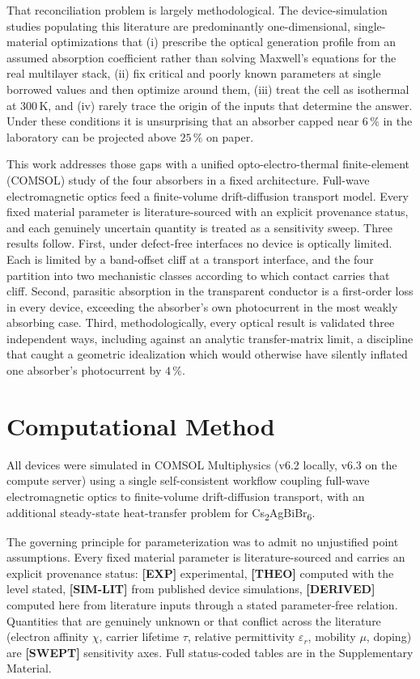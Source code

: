 \documentclass[lettersize,journal]{IEEEtran}
\newcommand{\CABB}{Cs\textsubscript{2}AgBiBr\textsubscript{6}}
\begin{document}
That reconciliation problem is largely methodological. The device-simulation
studies populating this literature are predominantly one-dimensional,
single-material optimizations that (i) prescribe the optical generation
profile from an assumed absorption coefficient rather than solving Maxwell's
equations for the real multilayer stack, (ii) fix critical and poorly known
parameters at single borrowed values and then optimize around them,
(iii) treat the cell as isothermal at $300\,\mathrm{K}$, and (iv) rarely trace
the origin of the inputs that determine the answer. Under these conditions it
is unsurprising that an absorber capped near $6\,\%$ in the laboratory can be
projected above $25\,\%$ on paper.

This work addresses those gaps with a unified opto-electro-thermal
finite-element (COMSOL) study of the four absorbers in a fixed architecture. Full-wave electromagnetic optics feed a finite-volume
drift-diffusion transport model. Every fixed material parameter is
literature-sourced with an explicit provenance status, and each genuinely
uncertain quantity is treated as a sensitivity sweep. Three results follow.
First, under defect-free interfaces no device is optically limited. Each is
limited by a band-offset cliff at a transport interface, and the four
partition into two mechanistic classes according to which contact carries
that cliff. Second, parasitic absorption in the transparent conductor is a
first-order loss in every device, exceeding the absorber's own photocurrent
in the most weakly absorbing case. Third, methodologically, every optical
result is validated three independent ways, including against an analytic
transfer-matrix limit, a discipline that caught a geometric idealization
which would otherwise have silently inflated one absorber's photocurrent by
$4\,\%$.

\section{Computational Method}
All devices were simulated in COMSOL Multiphysics (v6.2 locally, v6.3 on the
compute server) using a single self-consistent workflow coupling full-wave
electromagnetic optics to finite-volume drift-diffusion transport, with an
additional steady-state heat-transfer problem for \CABB.

The governing principle for parameterization was to admit no unjustified point
assumptions. Every fixed material parameter is literature-sourced and carries
an explicit provenance status: \textbf{[EXP]} experimental, \textbf{[THEO]}
computed with the level stated, \textbf{[SIM-LIT]} from published device
simulations, \textbf{[DERIVED]} computed here from literature inputs through a
stated parameter-free relation. Quantities that are genuinely unknown or that
conflict across the literature (electron affinity $\chi$, carrier lifetime
$\tau$, relative permittivity $\varepsilon_r$, mobility $\mu$, doping) are
\textbf{[SWEPT]} sensitivity axes. Full status-coded tables are in the
Supplementary Material.
\end{document}
